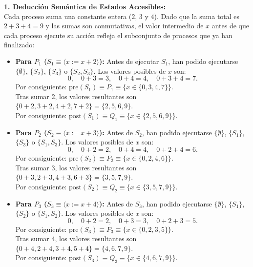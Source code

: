 \documentclass[11pt,a4paper,twoside,openright]{report}
\begin{document}
\begin{solucion}
\textbf{1. Deducción Semántica de Estados Accesibles:}\\
Cada proceso suma una constante entera ($2$, $3$ y $4$). Dado que la suma total es $2 + 3 + 4 = 9$ y las sumas son conmutativas, el valor intermedio de $x$ antes de que cada proceso ejecute su acción refleja el subconjunto de procesos que ya han finalizado:

\begin{itemize}
    \item \textbf{Para $P_1$ ($S_1 \equiv \langle x := x + 2 \rangle$):}
    Antes de ejecutar $S_1$, han podido ejecutarse $\{ \emptyset \}$, $\{S_2\}$, $\{S_3\}$ o $\{S_2, S_3\}$. Los valores posibles de $x$ son:
    \[
    0, \quad 0 + 3 = 3, \quad 0 + 4 = 4, \quad 0 + 3 + 4 = 7.
    \]
    Por consiguiente: $\text{pre}(S_1) \equiv P_1 \equiv \{x \in \{0, 3, 4, 7\}\}$.\\
    Tras sumar 2, los valores resultantes son $\{0+2, 3+2, 4+2, 7+2\} = \{2, 5, 6, 9\}$.\\
    Por consiguiente: $\text{post}(S_1) \equiv Q_1 \equiv \{x \in \{2, 5, 6, 9\}\}$.

    \item \textbf{Para $P_2$ ($S_2 \equiv \langle x := x + 3 \rangle$):}
    Antes de $S_2$, han podido ejecutarse $\{\emptyset\}$, $\{S_1\}$, $\{S_3\}$ o $\{S_1, S_3\}$. Los valores posibles de $x$ son:
    \[
    0, \quad 0 + 2 = 2, \quad 0 + 4 = 4, \quad 0 + 2 + 4 = 6.
    \]
    Por consiguiente: $\text{pre}(S_2) \equiv P_2 \equiv \{x \in \{0, 2, 4, 6\}\}$.\\
    Tras sumar 3, los valores resultantes son $\{0+3, 2+3, 4+3, 6+3\} = \{3, 5, 7, 9\}$.\\
    Por consiguiente: $\text{post}(S_2) \equiv Q_2 \equiv \{x \in \{3, 5, 7, 9\}\}$.

    \item \textbf{Para $P_3$ ($S_3 \equiv \langle x := x + 4 \rangle$):}
    Antes de $S_3$, han podido ejecutarse $\{\emptyset\}$, $\{S_1\}$, $\{S_2\}$ o $\{S_1, S_2\}$. Los valores posibles de $x$ son:
    \[
    0, \quad 0 + 2 = 2, \quad 0 + 3 = 3, \quad 0 + 2 + 3 = 5.
    \]
    Por consiguiente: $\text{pre}(S_3) \equiv P_3 \equiv \{x \in \{0, 2, 3, 5\}\}$.\\
    Tras sumar 4, los valores resultantes son $\{0+4, 2+4, 3+4, 5+4\} = \{4, 6, 7, 9\}$.\\
    Por consiguiente: $\text{post}(S_3) \equiv Q_3 \equiv \{x \in \{4, 6, 7, 9\}\}$.
\end{itemize}


\end{solucion}
\end{document}
